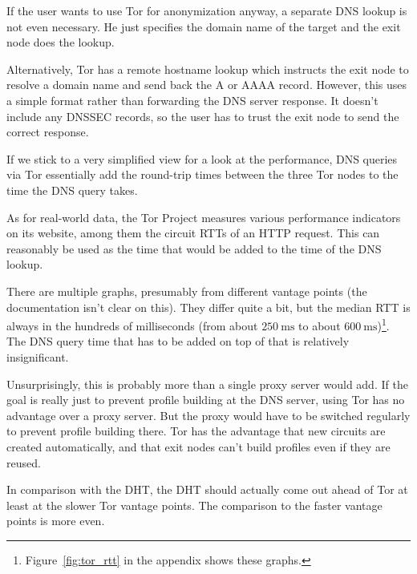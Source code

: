 If the user wants to use Tor for anonymization anyway, a separate DNS lookup is
not even necessary. He just specifies the domain name of the target and the exit
node does the lookup.

Alternatively, Tor has a remote hostname lookup which instructs the exit node to
resolve a domain name and send back the A or AAAA record. However, this uses a
simple format rather than forwarding the DNS server response. It doesn't include
any DNSSEC records, so the user has to trust the exit node to send the correct
response.

If we stick to a very simplified view for a look at the performance, DNS queries
via Tor essentially add the round-trip times between the three Tor nodes to the
time the DNS query takes.

As for real-world data, the Tor Project measures various performance indicators
on its website\cite{torperf}, among them the circuit RTTs of an HTTP request.
This can reasonably be used as the time that would be added to the time of the
DNS lookup.

There are multiple graphs, presumably from different vantage points (the
documentation isn't clear on this). They differ quite a bit, but the median RTT
is always in the hundreds of milliseconds (from about $\SI{250}{\milli\second}$
to about $\SI{600}{\milli\second}$)\footnote{Figure~\ref{fig:tor_rtt} in the
appendix shows these graphs.}. The DNS query time that has to be added on top of
that is relatively insignificant.

Unsurprisingly, this is probably more than a single proxy server would add. If
the goal is really just to prevent profile building at the DNS server, using Tor
has no advantage over a proxy server. But the proxy would have to be switched
regularly to prevent profile building there. Tor has the advantage that new
circuits are created automatically, and that exit nodes can't build profiles
even if they are reused.

In comparison with the DHT, the DHT should actually come out ahead of Tor at
least at the slower Tor vantage points. The comparison to the faster vantage
points is more even.
